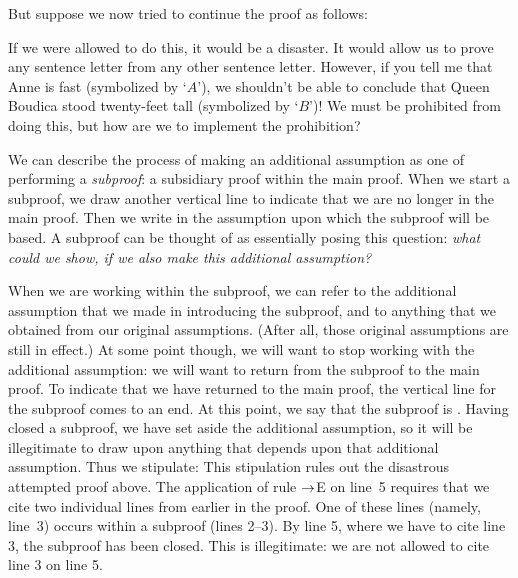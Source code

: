 But suppose we now tried to continue the proof as follows:
\begin{fitchproof}
	\PR
	\open
		\AS
		 
	\close
\ifHTMLtarget
	 
\else
	 
	 
\fi
\end{fitchproof}
If we were allowed to do this, it would be a disaster. It would allow us to prove any sentence letter from any other sentence letter. However, if you tell me that Anne is fast (symbolized by `$A$'), we shouldn't be able to conclude that Queen Boudica stood twenty-feet tall (symbolized by `$B$')! We must be prohibited from doing this, but how are we to implement the prohibition?

We can describe the process of making an additional assumption as one of performing a \emph{subproof}: a subsidiary proof within the main proof. When we start a subproof, we draw another vertical line to indicate that we are no longer in the main proof. Then we write in the assumption upon which the subproof will be based. A subproof can be thought of as essentially posing this question: \emph{what could we show, if we also make this additional assumption?}

When we are working within the subproof, we can refer to the additional assumption that we made in introducing the subproof, and to anything that we obtained from our original assumptions. (After all, those original assumptions are still in effect.) At some point though, we will want to stop working with the additional assumption: we will want to return from the subproof to the main proof. To indicate that we have returned to the main proof, the vertical line for the subproof comes to an end. At this point, we say that the subproof is . Having closed a subproof, we have set aside the additional assumption, so it will be illegitimate to draw upon anything that depends upon that additional assumption. Thus we stipulate:
This stipulation rules out the disastrous attempted proof above. The application of rule $\rightarrow$E on line~5 requires that we cite two individual lines from earlier in the proof. One of these lines (namely, line~3) occurs within a subproof (lines 2--3). By line 5, where we have to cite line 3, the subproof has been closed. This is illegitimate: we are not allowed to cite line 3 on line 5.

